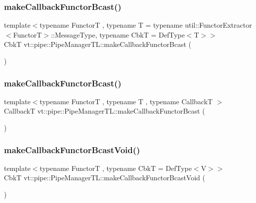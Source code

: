 \subsubsection{\texorpdfstring{make\+Callback\+Functor\+Bcast()}{makeCallbackFunctorBcast()}\hspace{0.1cm}{\footnotesize\ttfamily [1/2]}}
{\footnotesize\ttfamily template$<$typename FunctorT , typename T  = typename util\+::\+Functor\+Extractor$<$\+Functor\+T$>$\+::\+Message\+Type, typename CbkT  = Def\+Type$<$\+T$>$$>$ \\
CbkT vt\+::pipe\+::\+Pipe\+Manager\+T\+L\+::make\+Callback\+Functor\+Bcast (\begin{DoxyParamCaption}{ }\end{DoxyParamCaption})}

\mbox{\label{structvt_1_1pipe_1_1_pipe_manager_t_l_a023a1dde95875ecbbe53c7484e02caed}} 
\subsubsection{\texorpdfstring{make\+Callback\+Functor\+Bcast()}{makeCallbackFunctorBcast()}\hspace{0.1cm}{\footnotesize\ttfamily [2/2]}}
{\footnotesize\ttfamily template$<$typename FunctorT , typename T , typename CallbackT $>$ \\
CallbackT vt\+::pipe\+::\+Pipe\+Manager\+T\+L\+::make\+Callback\+Functor\+Bcast (\begin{DoxyParamCaption}{ }\end{DoxyParamCaption})}

\mbox{\label{structvt_1_1pipe_1_1_pipe_manager_t_l_a51f15a63c39eeef9ff73572711363bba}} 
\subsubsection{\texorpdfstring{make\+Callback\+Functor\+Bcast\+Void()}{makeCallbackFunctorBcastVoid()}\hspace{0.1cm}{\footnotesize\ttfamily [1/2]}}
{\footnotesize\ttfamily template$<$typename FunctorT , typename CbkT  = Def\+Type$<$\+V$>$$>$ \\
CbkT vt\+::pipe\+::\+Pipe\+Manager\+T\+L\+::make\+Callback\+Functor\+Bcast\+Void (\begin{DoxyParamCaption}{ }\end{DoxyParamCaption})}

